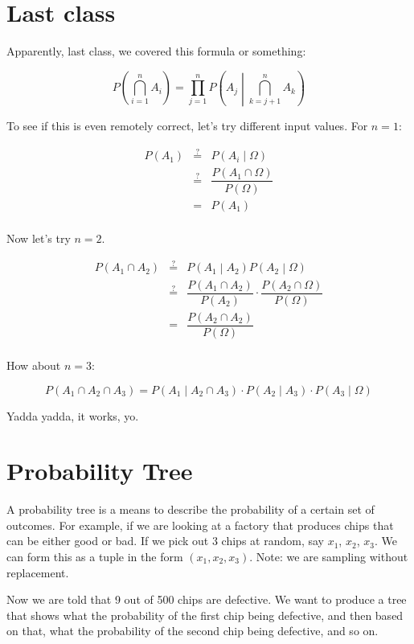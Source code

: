 \documentclass{article}
\begin{document}
\section*{Last class}

Apparently, last class, we covered this formula or something:

\[
P\left(\bigcap\limits_{i=1}^n A_i\right)
=
\prod\limits_{j=1}^n P\left(A_j \middle| \bigcap\limits_{k=j+1}^n A_k\right)
\]

To see if this is even remotely correct, let's try different input
values. For $n=1$:

\[
\begin{array}{rcl}
P(A_1) & \overset{?}{=} & P\left(A_i\middle|\Omega\right) \\
       & \overset{?}{=} & \dfrac{P(A_1\cap\Omega)}{P(\Omega)} \\
       & = & P(A_1) \\
\end{array}
\]

Now let's try $n=2$.

\[
\begin{array}{rcl}
P(A_1\cap A_2) & \overset{?}{=} & P\left(A_1\middle|A_2\right) P\left(A_2\middle|\Omega\right) \\
               & \overset{?}{=} & \dfrac{P(A_1\cap A_2)}{P(A_2)}\cdot\dfrac{P(A_2\cap\Omega)}{P(\Omega)} \\
               & = & \dfrac{P(A_2\cap A_2)}{P(\Omega)} \\
\end{array}
\]

How about $n=3$:

\[
P(A_1\cap A_2\cap A_3) = P(A_1\mid A_2\cap A_3) \cdot P(A_2\mid A_3)\cdot P(A_3\mid\Omega)
\]

Yadda yadda, it works, yo.

\section*{Probability Tree}

A probability tree is a means to describe the probability of a certain
set of outcomes. For example, if we are looking at a factory that
produces chips that can be either good or bad. If we pick out 3 chips
at random, say $x_1$, $x_2$, $x_3$. We can form this as a tuple in the
form $(x_1,x_2,x_3)$. Note: we are sampling without replacement.

Now we are told that 9 out of 500 chips are defective. We want to
produce a tree that shows what the probability of the first chip being
defective, and then based on that, what the probability of the second
chip being defective, and so on.
\end{document}
